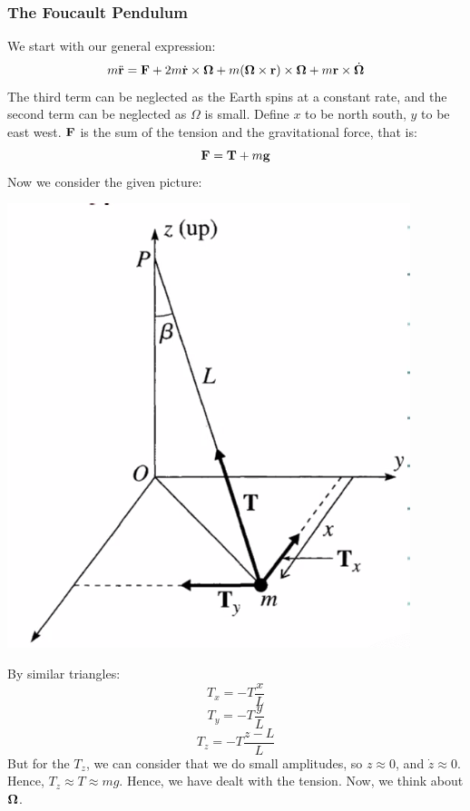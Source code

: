 \subsubsection{The Foucault Pendulum}
We start with our general expression:
\[m\ddot{\mathbf{r}} = \mathbf{F} + 2m\dot{\mathbf{r}}\times \mathbf{\Omega} + m(\mathbf{\Omega} \times \mathbf{r})\times \mathbf{\Omega} + m\mathbf{r}\times \dot{\mathbf{\Omega}}\]
The third term can be neglected as the Earth spins at a constant rate, and the second term can be neglected as $\Omega$ is small. Define $x$ to be north south, $y$ to be east west. $\mathbf{F}$ is the sum of the tension and the gravitational force, that is:
\[\mathbf{F} = \mathbf{T} + m\mathbf{g}\]
Now we consider the given picture:
\begin{center}
    \includegraphics[scale=0.5]{Lecture-16/l16-img4.png}
\end{center}
By similar triangles:
\[T_x = -T\frac{x}{L}\]
\[T_y = -T\frac{y}{L}\]
\[T_z = -T\frac{z-L}{L}\]
But for the $T_z$, we can consider that we do small amplitudes, so $z \approx 0$, and $\dot{z} \approx 0$. Hence, $T_z \approx T \approx mg$. Hence, we have dealt with the tension. Now, we think about $\mathbf{\Omega}$.
